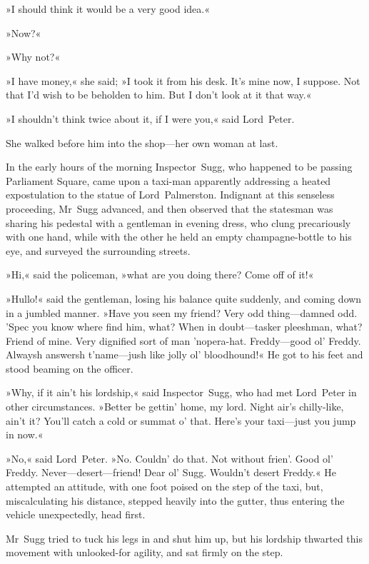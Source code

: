 »I should think it would be a very good idea.«

»Now?«

»Why not?«

»I have money,« she said; »I took it from his desk. It's mine now, I suppose. Not that I'd wish to be beholden to him. But I don't look at it that way.«

»I shouldn't think twice about it, if I were you,« said Lord~Peter.

She walked before him into the shop—her own woman at last. 

\divider

In the early hours of the morning Inspector~Sugg, who happened to be passing Parliament Square, came upon a taxi-man apparently addressing a heated expostulation to the statue of Lord~Palmerston. Indignant at this senseless proceeding, Mr~Sugg advanced, and then observed that the statesman was sharing his pedestal with a gentleman in evening dress, who clung precariously with one hand, while with the other he held an empty champagne-bottle to his eye, and surveyed the surrounding streets.

»Hi,« said the policeman, »what are you doing there? Come off of it!«

»Hullo!« said the gentleman, losing his balance quite suddenly, and coming down in a jumbled manner. »Have you seen my friend? Very odd thing—damned odd. 'Spec you know where find him, what? When in doubt—tasker pleeshman, what? Friend of mine. Very dignified sort of man 'nopera-hat. Freddy—good ol' Freddy. Alwaysh answersh t'name—jush like jolly ol' bloodhound!« He got to his feet and stood beaming on the officer.

»Why, if it ain't his lordship,« said Inspector~Sugg, who had met Lord~Peter in other circumstances. »Better be gettin' home, my lord. Night air's chilly-like, ain't it? You'll catch a cold or summat o' that.  Here's your taxi—just you jump in now.«

»No,« said Lord~Peter. »No. Couldn' do that. Not without frien'. Good ol' Freddy. Never—desert—friend! Dear ol' Sugg. Wouldn't desert Freddy.« He attempted an attitude, with one foot poised on the step of the taxi, but, miscalculating his distance, stepped heavily into the gutter, thus entering the vehicle unexpectedly, head first.

Mr~Sugg tried to tuck his legs in and shut him up, but his lordship thwarted this movement with unlooked-for agility, and sat firmly on the step.

